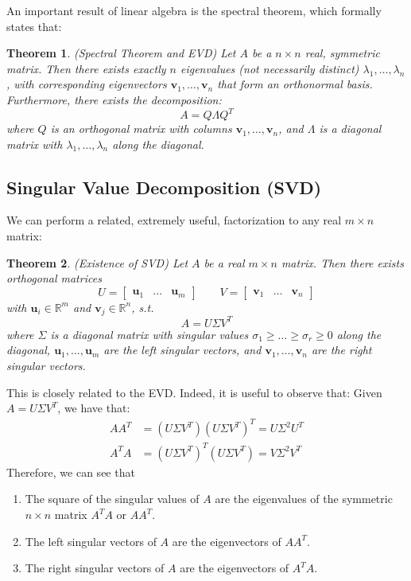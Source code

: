 \documentclass[11pt]{article}
\newtheorem{theorem}{Theorem}[section]
\begin{document}
An important result of linear algebra is the spectral theorem, which formally states that:
\begin{theorem}
\emph{(Spectral Theorem and EVD)}
\label{EVD}
Let $A$ be a $n \times n$ real, symmetric matrix. Then there exists exactly $n$ eigenvalues (not necessarily distinct) $\lambda_1, \ldots, \lambda_n$, with corresponding eigenvectors $\mathbf{v}_1, \ldots, \mathbf{v}_n$ that form an orthonormal basis. Furthermore, there exists the decomposition:
\[A = Q \Lambda Q^T\]
where $Q$ is an orthogonal matrix with columns $\mathbf{v}_1, \ldots, \mathbf{v}_n$, and $\Lambda$ is a diagonal matrix with $\lambda_1, \ldots, \lambda_n$ along the diagonal.
\end{theorem}

\subsection*{Singular Value Decomposition (SVD)}

We can perform a related, extremely useful, factorization to any real $m \times n$ matrix:
\begin{theorem}
\emph{(Existence of SVD)}
\label{SVD}
Let $A$ be a real $m \times n$ matrix. Then there exists orthogonal matrices
\[U =\begin{bmatrix} \mathbf{u}_1& \ldots & \mathbf{u}_m \end{bmatrix} \qquad V =\begin{bmatrix} \mathbf{v}_1& \ldots & \mathbf{v}_n \end{bmatrix}\]
with $\mathbf{u}_i \in \mathbb{R}^m$ and $\mathbf{v}_j \in \mathbb{R}^n$, s.t.
\[A = U \Sigma V^T\]
where $\Sigma$ is a diagonal matrix with singular values $\sigma_1 \ge \ldots \ge \sigma_r \ge 0$ along the diagonal, $\mathbf{u}_1, \ldots, \mathbf{u}_m$ are the left singular vectors, and $\mathbf{v}_1, \ldots, \mathbf{v}_n$ are the right singular vectors.
\end{theorem}

This is closely related to the EVD. Indeed, it is useful to observe that:
Given $A = U\Sigma V^T$, we have that:
\begin{align*}
AA^T &= (U \Sigma V^T) (U \Sigma V^T)^T = U \Sigma^2 U^T\\
A^TA &= (U \Sigma V^T)^T (U \Sigma V^T) = V \Sigma^2 V^T
\end{align*}
Therefore, we can see that
\begin{enumerate}
\item The square of the singular values of $A$ are the eigenvalues of the symmetric $n \times n$ matrix $A^TA$ or $AA^T$.
\item The left singular vectors of $A$ are the eigenvectors of $AA^T$.
\item The right singular vectors of $A$ are the eigenvectors of $A^TA$.
\end{enumerate}
\end{document}
